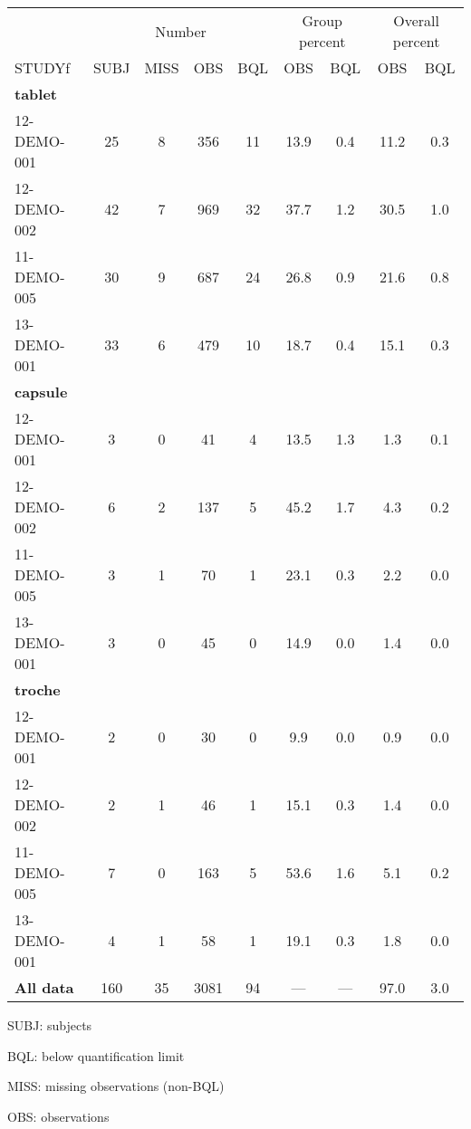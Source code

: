 \setlength{\tabcolsep}{5pt} 
\begin{threeparttable}
\renewcommand{\arraystretch}{1.3}
\begin{tabular}[h]{lcccccccc}
\hline
\multicolumn{1}{c}{} & \multicolumn{4}{c}{Number} & \multicolumn{2}{c}{Group percent} & \multicolumn{2}{c}{Overall percent} \\
\cmidrule(lr){2-5}
\cmidrule(lr){6-7}
\cmidrule(lr){8-9}
STUDYf & SUBJ & MISS & OBS & BQL & OBS & BQL & OBS & BQL \\
\hline
\multicolumn{9}{l}{\textbf{tablet}}\\
12-DEMO-001 & 25 & 8 & 356 & 11 & 13.9 & 0.4 & 11.2 & 0.3 \\
12-DEMO-002 & 42 & 7 & 969 & 32 & 37.7 & 1.2 & 30.5 & 1.0 \\
11-DEMO-005 & 30 & 9 & 687 & 24 & 26.8 & 0.9 & 21.6 & 0.8 \\
13-DEMO-001 & 33 & 6 & 479 & 10 & 18.7 & 0.4 & 15.1 & 0.3 \\
\hline \multicolumn{9}{l}{\textbf{capsule}}\\
12-DEMO-001 & 3 & 0 & 41 & 4 & 13.5 & 1.3 & 1.3 & 0.1 \\
12-DEMO-002 & 6 & 2 & 137 & 5 & 45.2 & 1.7 & 4.3 & 0.2 \\
11-DEMO-005 & 3 & 1 & 70 & 1 & 23.1 & 0.3 & 2.2 & 0.0 \\
13-DEMO-001 & 3 & 0 & 45 & 0 & 14.9 & 0.0 & 1.4 & 0.0 \\
\hline \multicolumn{9}{l}{\textbf{troche}}\\
12-DEMO-001 & 2 & 0 & 30 & 0 & 9.9 & 0.0 & 0.9 & 0.0 \\
12-DEMO-002 & 2 & 1 & 46 & 1 & 15.1 & 0.3 & 1.4 & 0.0 \\
11-DEMO-005 & 7 & 0 & 163 & 5 & 53.6 & 1.6 & 5.1 & 0.2 \\
13-DEMO-001 & 4 & 1 & 58 & 1 & 19.1 & 0.3 & 1.8 & 0.0 \\
\hline \hline {\bf All data} & 160 & 35 & 3081 & 94 & --- & --- & 97.0 & 3.0 \\
\hline
\end{tabular}
\begin{tablenotes}[flushleft]
\item SUBJ: subjects
\item BQL: below quantification limit
\item MISS: missing observations (non-BQL)
\item OBS: observations
\end{tablenotes}
\end{threeparttable}
